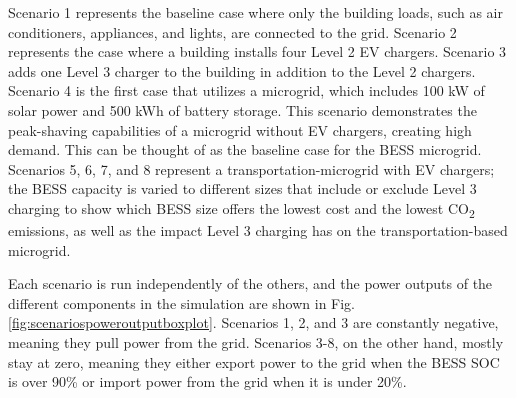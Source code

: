 \documentclass[conference]{IEEEtran}
\begin{document}
	Scenario 1 represents the baseline case where only the building loads, such as air conditioners, appliances, and lights, are connected to the grid. Scenario 2 represents the case where a building installs four Level 2 EV chargers. Scenario 3 adds one Level 3 charger to the building in addition to the Level 2 chargers. Scenario 4 is the first case that utilizes a microgrid, which includes 100 kW of solar power and 500 kWh of battery storage. This scenario demonstrates the peak-shaving capabilities of a microgrid without EV chargers, creating high demand. This can be thought of as the baseline case for the BESS microgrid. Scenarios 5, 6, 7, and 8 represent a transportation-microgrid with EV chargers; the BESS capacity is varied to different sizes that include or exclude Level 3 charging to show which BESS size offers the lowest cost and the lowest CO\textsubscript{2} emissions, as well as the impact Level 3 charging has on the transportation-based microgrid.
	
	Each scenario is run independently of the others, and the power outputs of the different components in the simulation are shown in Fig. \ref{fig:scenariospoweroutputboxplot}. Scenarios 1, 2, and 3 are constantly negative, meaning they pull power from the grid. Scenarios 3-8, on the other hand, mostly stay at zero, meaning they either export power to the grid when the BESS SOC is over 90\% or import power from the grid when it is under 20\%.
	
\end{document}
